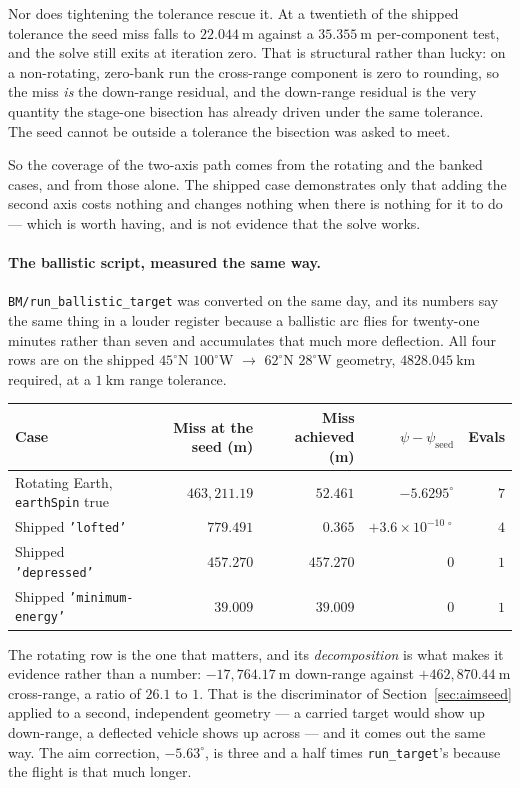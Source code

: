\documentclass[11pt]{article}
\newcommand{\code}[1]{\texttt{#1}}
\begin{document}
Nor does tightening the tolerance rescue it. At a twentieth of the shipped
tolerance the seed miss falls to $22.044~\mathrm{m}$ against a
$35.355~\mathrm{m}$ per-component test, and the solve still exits at iteration
zero. That is structural rather than lucky: on a non-rotating, zero-bank run
the cross-range component is zero to rounding, so the miss \emph{is} the
down-range residual, and the down-range residual is the very quantity the
stage-one bisection has already driven under the same tolerance. The seed
cannot be outside a tolerance the bisection was asked to meet.

So the coverage of the two-axis path comes from the rotating and the banked
cases, and from those alone. The shipped case demonstrates only that adding the
second axis costs nothing and changes nothing when there is nothing for it to
do --- which is worth having, and is not evidence that the solve works.

\paragraph{The ballistic script, measured the same way.}
\code{BM/run\_ballistic\_target} was converted on the same day, and its numbers
say the same thing in a louder register because a ballistic arc flies for
twenty-one minutes rather than seven and accumulates that much more deflection.
All four rows are on the shipped $45^{\circ}$N $100^{\circ}$W $\to$
$62^{\circ}$N $28^{\circ}$W geometry, $4828.045~\mathrm{km}$ required, at a
$1~\mathrm{km}$ range tolerance.

\begin{center}\small
\begin{tabular}{@{}lrrrr@{}}
\toprule
Case & Miss at the seed (m) & Miss achieved (m) & $\psi-\psi_{\text{seed}}$ & Evals \\
\midrule
Rotating Earth, \code{earthSpin} true & $463{,}211.19$ & $52.461$ & $-5.6295^{\circ}$ & $7$ \\
Shipped \code{'lofted'}               & $779.491$      & $0.365$  & $+3.6\times10^{-10\,\circ}$ & $4$ \\
Shipped \code{'depressed'}            & $457.270$      & $457.270$ & $0$ & $1$ \\
Shipped \code{'minimum-energy'}       & $39.009$       & $39.009$  & $0$ & $1$ \\
\bottomrule
\end{tabular}
\end{center}

The rotating row is the one that matters, and its \emph{decomposition} is what
makes it evidence rather than a number: $-17{,}764.17~\mathrm{m}$ down-range
against $+462{,}870.44~\mathrm{m}$ cross-range, a ratio of $26.1$ to $1$. That
is the discriminator of Section~\ref{sec:aimseed} applied to a second,
independent geometry --- a carried target would show up down-range, a deflected
vehicle shows up across --- and it comes out the same way. The aim correction,
$-5.63^{\circ}$, is three and a half times \code{run\_target}'s because the
flight is that much longer.
\end{document}
